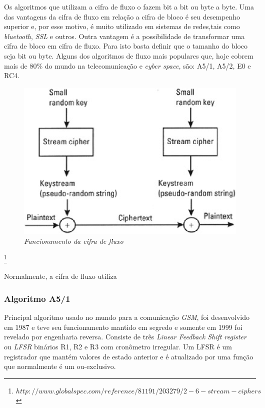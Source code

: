 Os algoritmos que utilizam a cifra de fluxo o fazem bit a bit ou byte a byte. Uma das vantagens da cifra de fluxo em relação a cifra de bloco é seu desempenho superior e, por esse motivo, é muito utilizado em sistemas de redes,tais como \textit{bluetooth}, \textit{SSL} e outros. Outra vantagem é a possibilidade de transformar uma cifra de bloco em cifra de fluxo. Para isto basta definir que o tamanho do bloco seja bit ou byte. Alguns dos algoritmos de fluxo mais populares que, hoje cobrem mais de 80$\%$ do mundo na telecomunicação e \textit{cyber space}, são: A5/1, A5/2, E0 e RC4. ~\cite{majid-mohd}
\begin{figure}[h]
\centering
\includegraphics[keepaspectratio=true,scale=0.7]
    {figuras/stream_cipher.eps}
    \caption{\textit{Funcionamento da cifra de fluxo } } 
\end{figure}\footnote{$http://www.globalspec.com/reference/81191/203279/2-6-stream-ciphers$}

Normalmente, a cifra de fluxo utiliza 
\subsubsection{Algoritmo A5/1}
\label{algorithm-a51}

Principal algoritmo usado no mundo para a comunicação \textit{GSM}, foi desenvolvido em 1987 e teve seu funcionamento mantido em segredo e somente em 1999 foi revelado por engenharia reversa. Consiste de três \textit{Linear Feedback Shift register} ou \textit{LFSR} binários R1, R2 e R3 com cronômetro irregular. Um LFSR é um registrador que mantém valores de estado anterior e é atualizado por uma função que normalmente é um ou-exclusivo. 


